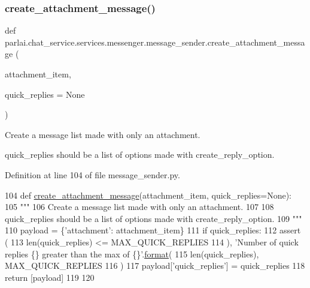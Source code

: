 \subsubsection{\texorpdfstring{create\+\_\+attachment\+\_\+message()}{create\_attachment\_message()}}
{\footnotesize\ttfamily def parlai.\+chat\+\_\+service.\+services.\+messenger.\+message\+\_\+sender.\+create\+\_\+attachment\+\_\+message (\begin{DoxyParamCaption}\item[{}]{attachment\+\_\+item,  }\item[{}]{quick\+\_\+replies = {\ttfamily None} }\end{DoxyParamCaption})}

\begin{DoxyVerb}Create a message list made with only an attachment.

quick_replies should be a list of options made with create_reply_option.
\end{DoxyVerb}
 

Definition at line 104 of file message\+\_\+sender.\+py.


\begin{DoxyCode}
104 \textcolor{keyword}{def }\hyperlink{namespaceparlai_1_1chat__service_1_1services_1_1messenger_1_1message__sender_a2b2d0c5879079ba1320a7ed62893d7de}{create\_attachment\_message}(attachment\_item, quick\_replies=None):
105     \textcolor{stringliteral}{"""}
106 \textcolor{stringliteral}{    Create a message list made with only an attachment.}
107 \textcolor{stringliteral}{}
108 \textcolor{stringliteral}{    quick\_replies should be a list of options made with create\_reply\_option.}
109 \textcolor{stringliteral}{    """}
110     payload = \{\textcolor{stringliteral}{'attachment'}: attachment\_item\}
111     \textcolor{keywordflow}{if} quick\_replies:
112         \textcolor{keyword}{assert} (
113             len(quick\_replies) <= MAX\_QUICK\_REPLIES
114         ), \textcolor{stringliteral}{'Number of quick replies \{\} greater than the max of \{\}'}.\hyperlink{namespaceparlai_1_1chat__service_1_1services_1_1messenger_1_1shared__utils_a32e2e2022b824fbaf80c747160b52a76}{format}(
115             len(quick\_replies), MAX\_QUICK\_REPLIES
116         )
117         payload[\textcolor{stringliteral}{'quick\_replies'}] = quick\_replies
118     \textcolor{keywordflow}{return} [payload]
119 
120 
\end{DoxyCode}
\mbox{\label{namespaceparlai_1_1chat__service_1_1services_1_1messenger_1_1message__sender_aad605cb9ba870a032f7b09775bebabb1}} 
